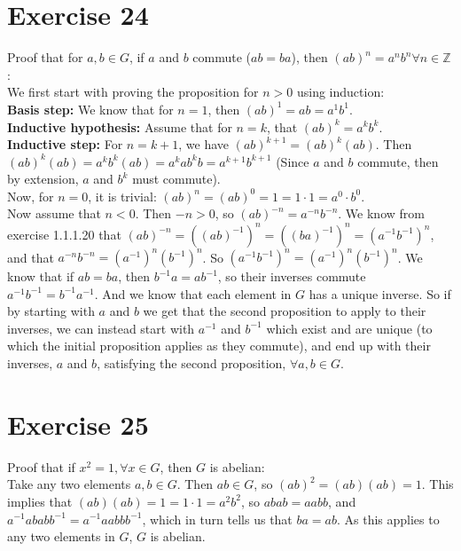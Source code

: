 \documentclass[12pt]{article}
\newcommand{\Z}{\mathbb{Z}}
\begin{document}
    
    \section*{Exercise 24}
    Proof that for $a, b \in G$,
    if $a$ and $b$ commute ($ab = ba$),
    then $(ab)^n = a^nb^n \forall n \in \Z$: \\
    We first start with proving the proposition for $n > 0$ using induction: \\
    \textbf{Basis step:}
    We know that for $n = 1$, then $(ab)^1 = ab = a^1b^1$. \\
    \textbf{Inductive hypothesis:}
    Assume that for $n = k$, that $(ab)^k = a^kb^k$. \\
    \textbf{Inductive step:}
    For $n = k + 1$, we have $(ab)^{k+1} = (ab)^k(ab)$.
    Then $(ab)^k(ab) = a^kb^k(ab) = a^kab^kb = a^{k+1}b^{k+1}$
    (Since $a$ and $b$ commute,
    then by extension, $a$ and $b^k$ must commute). \\
    Now, for $n = 0$, it is trivial:
    $(ab)^n = (ab)^0 = 1 = 1 \cdot 1 = a^0 \cdot b^0$. \\
    Now assume that $n < 0$.
    Then $-n > 0$,
    so $(ab)^{-n} = a^{-n}b^{-n}$.
    We know from exercise 1.1.1.20 that $(ab)^{-n}
    = ((ab)^{-1})^n
    = ((ba)^{-1})^n
    = (a^{-1}b^{-1})^n$,
    and that $a^{-n}b^{-n} = (a^{-1})^n(b^{-1})^n$.
    So $(a^{-1}b^{-1})^n = (a^{-1})^n(b^{-1})^n$.
    We know that if $ab = ba$,
    then $b^{-1}a = ab^{-1}$,
    so their inverses commute $a^{-1}b^{-1} = b^{-1}a^{-1}$.
    And we know that each element in $G$ has a unique inverse.
    So if by starting with $a$ and $b$
    we get that the second proposition to apply to their inverses,
    we can instead start with $a^{-1}$ and $b^{-1}$ which exist and are unique
    (to which the initial proposition applies as they commute),
    and end up with their inverses, $a$ and $b$, satisfying the second
    proposition, $\forall a, b \in G$.


    \section*{Exercise 25}
    Proof that if $x^2 = 1, \forall x \in G$,
    then $G$ is abelian: \\
    Take any two elements $a, b \in G$.
    Then $ab \in G$,
    so $(ab)^2 = (ab)(ab) = 1$.
    This implies that $(ab)(ab) = 1 = 1 \cdot 1 = a^2b^2$,
    so $abab = aabb$,
    and $a^{-1}ababb^{-1} = a^{-1}aabbb^{-1}$,
    which in turn tells us that $ba = ab$.
    As this applies to any two elements in $G$, $G$ is abelian.
\end{document}
